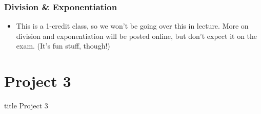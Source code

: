 \documentclass{beamer}
\begin{document}
    	
    	\begin{frame}
    		\frametitle{Division \& Exponentiation}
    		\begin{itemize}
    			\item This is a 1-credit class, so we won't be going over this in lecture. More on division and exponentiation will be posted online, but don't expect it on the exam. (It's fun stuff, though!)
    		\end{itemize}
    	\end{frame}
    	
    	
    	
    	
    	
    	
    \section{Project 3}
    
    	\begin{frame}
                \vfill
                \centering
                \begin{beamercolorbox}[sep=8pt,center,shadow=true,rounded=true]{title}
                    Project 3\par%
                \end{beamercolorbox}
                \vfill
             \end{frame}
   
    
\end{document}
